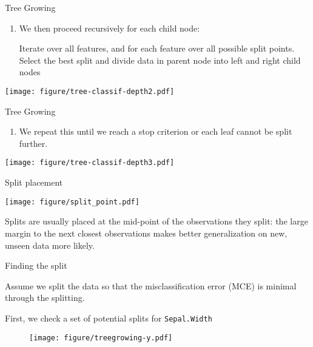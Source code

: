 \documentclass[11pt,compress,t,notes=noshow, xcolor=table]{beamer}
\begin{document}
\begin{vbframe}{Tree Growing}

\begin{enumerate}[3]
\item We then proceed recursively for each child node:

Iterate over all features, and for each feature over all possible split points. Select the best split and divide data in parent node into left and right child nodes
\end{enumerate}

\color{fgcolor}

{\centering \texttt{[image: figure/tree-classif-depth2.pdf]} 

}

\end{vbframe}

\begin{vbframe}{Tree Growing}
\begin{enumerate}[4]
\item We repeat this until we reach a stop criterion or each leaf cannot be split further.
\end{enumerate}

\color{fgcolor}

{\centering \texttt{[image: figure/tree-classif-depth3.pdf]} 

}

\end{vbframe}



\begin{vbframe}{Split placement}
\begin{knitrout}\scriptsize
{}\color{fgcolor}

{\centering \texttt{[image: figure/split\_point.pdf]}

}



\end{knitrout}
\lz
Splits are usually placed at the mid-point of the observations they split: the large margin to the next closest observations makes better generalization on new, unseen data more likely.
\end{vbframe}

\begin{vbframe}{Finding the split}

Assume we split the data so that the misclassification error (MCE) is minimal through the splitting.

First, we check a set of potential splits for \texttt{Sepal.Width}

\begin{figure}
\texttt{[image: figure/treegrowing-y.pdf]}
\end{figure}

\end{vbframe}
\end{document}
